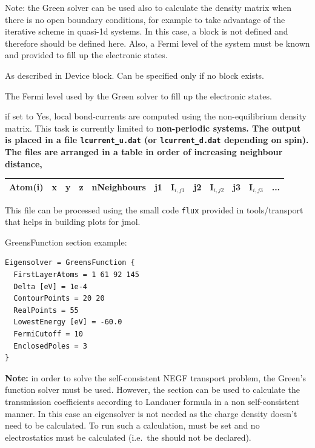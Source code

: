 \begin{description}
Note: the Green solver can be used also to calculate the density matrix when
there is no open boundary conditions, for example to take advantage of the
iterative scheme in quasi-1d systems. In this case, a  block is
not defined and therefore  should be defined here. Also, a
Fermi level of the system must be known and provided to fill up the electronic
states.

\item[\is{FirstLayerAtoms}] As described in Device block. Can be specified only
  if no  block exists.

\item[\is{FermiLevel}] The Fermi level used by the Green
  solver to fill up the electronic states.

\item[\is{LocalCurrents}] if set to Yes, local bond-currents are computed using
  the non-equilibrium density matrix.  This task is currently limited to
  \bf{non-periodic} systems. The output is placed in a file
  \verb|lcurrent_u.dat| (or \verb|lcurrent_d.dat| depending on spin).  The files
  are arranged in a table in order of increasing neighbour distance,

\begin{tabular}{|c|c|c|c|c|c|c|c|c|c|c|c|}
  \hline
  Atom(i) & x & y & z &  nNeighbours &  j1 & I$_{i,j1}$ & j2 & I$_{i,j2}$ &  j3 & I$_{i,j3}$ & ...\\
  \hline
\end{tabular}

  This file can be processed using the small code \verb|flux| provided in
  tools/transport that helps in building plots for jmol.
\end{description}

GreensFunction section example:

\begin{verbatim}
Eigensolver = GreensFunction {
  FirstLayerAtoms = 1 61 92 145
  Delta [eV] = 1e-4
  ContourPoints = 20 20
  RealPoints = 55
  LowestEnergy [eV] = -60.0
  FermiCutoff = 10
  EnclosedPoles = 3
}
\end{verbatim}


\textbf{Note:} in order to solve the self-consistent NEGF transport problem, the
Green's function solver must be used. However, the  section
can be used to calculate the transmission coefficients according to Landauer
formula in a non self-consistent manner. In this case an eigensolver is not
needed as the charge density doesn't need to be calculated.  To run such a
calculation,  must be set and no electrostatics
must be calculated (i.e.\ the  should not be
declared).


